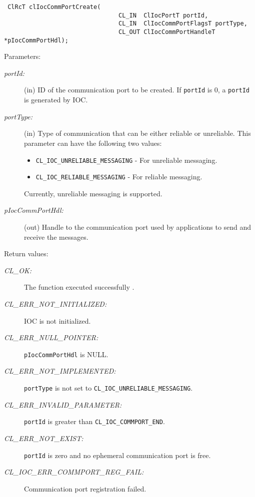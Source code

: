 \begin{flushleft}
\begin{Desc}
\footnotesize\begin{verbatim} ClRcT clIocCommPortCreate(
                           		CL_IN  ClIocPortT portId,
                           		CL_IN  ClIocCommPortFlagsT portType,
                           		CL_OUT ClIocCommPortHandleT *pIocCommPortHdl);
\end{verbatim}
\normalsize
\end{Desc}
\begin{Desc}
\item[Parameters:]
\begin{description}
\item[{\em port\-Id:}](in) ID of the communication port to be created. If {\tt{port\-Id}} is 0, a {\tt{port\-Id}} is generated by IOC.
\item[{\em port\-Type:}](in) Type of communication that can be either reliable or unreliable. This parameter can have the following two values: 
\begin{itemize}
\item {\tt{CL\_\-IOC\_\-UNRELIABLE\_\-MESSAGING}} - For unreliable messaging. 
\item {\tt{CL\_\-IOC\_\-RELIABLE\_\-MESSAGING}} - For reliable messaging. 
\end{itemize}
Currently, unreliable messaging is supported.
\item[{\em p\-Ioc\-Comm\-Port\-Hdl:}](out) Handle to the communication port used by applications to send and receive the messages.\end{description}
\end{Desc}
\begin{Desc}
\item[Return values:]
\begin{description}
\item[{\em CL\_\-OK:}]The function executed successfully . 
\item[{\em CL\_\-ERR\_\-NOT\_\-INITIALIZED:}]IOC is not initialized. 
\item[{\em CL\_\-ERR\_\-NULL\_\-POINTER:}]{\tt{p\-Ioc\-Comm\-Port\-Hdl}} is NULL. 
\item[{\em CL\_\-ERR\_\-NOT\_\-IMPLEMENTED:}]{\tt{port\-Type}} is not set to {\tt{CL\_\-IOC\_\-UNRELIABLE\_\-MESSAGING}}. 
\item[{\em CL\_\-ERR\_\-INVALID\_\-PARAMETER:}]{\tt{port\-Id}} is greater than {\tt{CL\_\-IOC\_\-COMMPORT\_\-END}}. 
\item[{\em CL\_\-ERR\_\-NOT\_\-EXIST:}]{\tt{port\-Id}} is zero and no ephemeral communication port is free. 
\item[{\em CL\_\-IOC\_\-ERR\_\-COMMPORT\_\-REG\_\-FAIL:}]Communication port registration failed. 

\end{description}
\end{Desc}
\end{flushleft}
